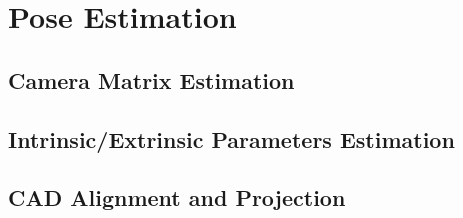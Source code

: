 \section{Pose Estimation}

\subsection{Camera Matrix Estimation}

\subsection{Intrinsic/Extrinsic Parameters Estimation}

\subsection{CAD Alignment and Projection}
